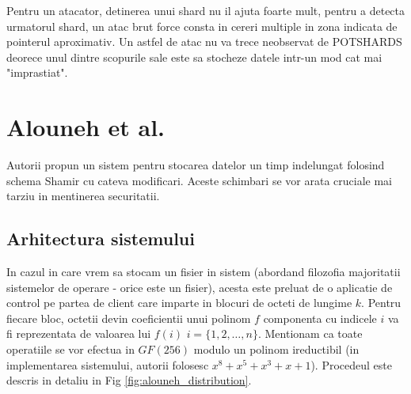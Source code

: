 \documentclass{llncs}
\begin{document}
Pentru un atacator, detinerea unui shard nu il ajuta foarte mult, pentru a detecta urmatorul shard, un atac brut force consta in cereri multiple in zona indicata de pointerul aproximativ. Un astfel de atac nu va trece neobservat de POTSHARDS deorece unul dintre scopurile sale este sa stocheze datele intr-un mod cat mai "imprastiat".\cite{SGMV:2009}

\section{Alouneh et al.}
\label{desc_alouneh}

Autorii propun un sistem pentru stocarea datelor un timp indelungat folosind schema Shamir cu cateva modificari. Aceste schimbari se vor arata cruciale mai tarziu in mentinerea securitatii.

\subsection{Arhitectura sistemului}
In cazul in care vrem sa stocam un fisier in sistem (abordand filozofia majoritatii sistemelor de operare - orice este un fisier), acesta este preluat de o aplicatie de control pe partea de client care imparte in blocuri de octeti de lungime $k$. Pentru fiecare bloc, octetii devin coeficientii unui polinom $f$ componenta cu indicele $i$ va fi reprezentata de valoarea lui $f(i)$ $i = \{1,2,\dots, n\}$. Mentionam ca toate operatiile se vor efectua in $GF(256)$ modulo un polinom ireductibil (in implementarea sistemului, autorii folosesc $x^8 + x^5 + x^3 + x + 1$). Procedeul este descris in detaliu in Fig \ref{fig:alouneh_distribution}.
\end{document}
